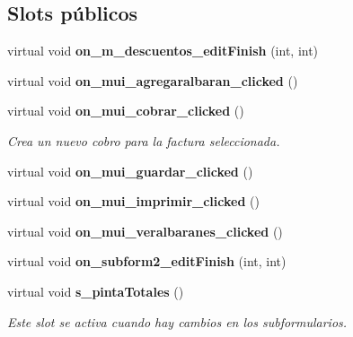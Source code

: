 \subsection*{Slots p\'{u}blicos}
\begin{CompactItemize}
\item 
virtual void {\bf on\_\-m\_\-descuentos\_\-edit\-Finish} (int, int)\label{classFacturaView_i0}

\item 
virtual void {\bf on\_\-mui\_\-agregaralbaran\_\-clicked} ()
\item 
virtual void {\bf on\_\-mui\_\-cobrar\_\-clicked} ()\label{classFacturaView_i2}

\begin{CompactList}\small\item\em Crea un nuevo cobro para la factura seleccionada. \item\end{CompactList}\item 
virtual void {\bf on\_\-mui\_\-guardar\_\-clicked} ()\label{classFacturaView_i3}

\item 
virtual void {\bf on\_\-mui\_\-imprimir\_\-clicked} ()\label{classFacturaView_i4}

\item 
virtual void {\bf on\_\-mui\_\-veralbaranes\_\-clicked} ()\label{classFacturaView_i5}

\item 
virtual void {\bf on\_\-subform2\_\-edit\-Finish} (int, int)\label{classFacturaView_i6}

\item 
virtual void {\bf s\_\-pinta\-Totales} ()\label{classFacturaView_i7}

\begin{CompactList}\small\item\em Este slot se activa cuando hay cambios en los subformularios. \item\end{CompactList}\end{CompactItemize}
